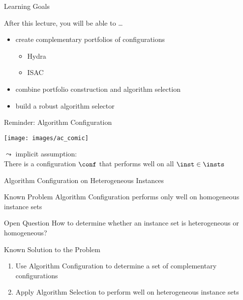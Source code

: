 \begin{frame}[c]{Learning Goals}

After this lecture, you will be able to \ldots

\begin{itemize}
  \item create complementary portfolios of configurations
  \begin{itemize}
    \item Hydra
    \item ISAC
  \end{itemize}
  \item combine portfolio construction and algorithm selection
  \item build a robust algorithm selector
\end{itemize}


\end{frame}
\begin{frame}[c]{Reminder: Algorithm Configuration}

\texttt{[image: images/ac\_comic]}

\pause

\bigskip
$\leadsto$ implicit assumption:\\ There is a configuration $\conf$ that performs well on all $\inst \in \insts$

\end{frame}
\begin{frame}[c]{Algorithm Configuration on Heterogeneous Instances}

\begin{block}{Known Problem}
Algorithm Configuration performs only well on homogeneous instance sets
\end{block}

\pause
\bigskip

\begin{block}{Open Question}
How to determine whether an instance set is heterogeneous or homogeneous?
\end{block}  

\pause
\bigskip

\begin{block}{Known Solution to the Problem}
\begin{enumerate}
  \item Use Algorithm Configuration to determine a set of complementary configurations
  \item Apply Algorithm Selection to perform well on heterogeneous instance sets
\end{enumerate}
\end{block}

\end{frame}
